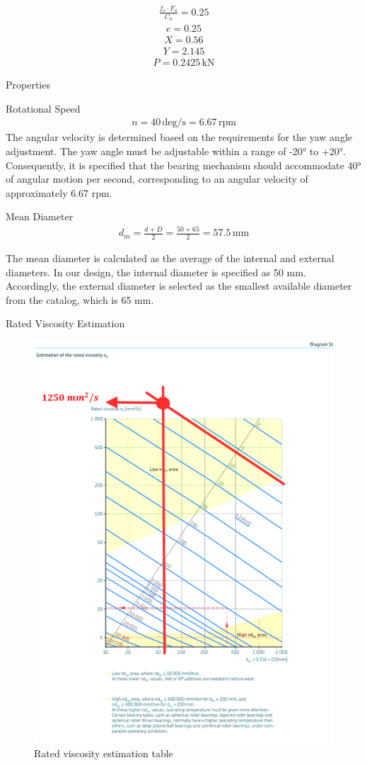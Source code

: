 \documentclass[12pt]{article}
\begin{document}
\begin{align}
\frac{f_o \cdot F_a}{C_o} = 0.25
\end{align}
\begin{align}
e = 0.25
\end{align}
\begin{align}
X=0.56
\end{align}
\begin{align}
Y=2.145
\end{align}
\begin{align}
P=0.2425  \,\mathrm{kN}
\end{align}

Properties

Rotational Speed \begin{align}
n = 40 \, \text{deg/s} = 6.67 \, \text{rpm}
\end{align}
The angular velocity is determined based on the requirements for the yaw angle adjustment. The yaw angle must be adjustable within a range of -20° to +20°. Consequently, it is specified that the bearing mechanism should accommodate 40° of angular motion per second, corresponding to an angular velocity of approximately 6.67 rpm.	

Mean Diameter
\begin{align}
d_m = \frac{d + D}{2} = \frac{50 + 65}{2} = 57.5 \, \mathrm{mm}
\end{align}

The mean diameter is calculated as the average of the internal and external diameters. In our design, the internal diameter is specified as 50 mm. Accordingly, the external diameter is selected as the smallest available diameter from the catalog, which is 65 mm.

Rated Viscosity Estimation

\begin{figure}[h!]
    \centering
    \includegraphics[width=0.5\linewidth]{ratedviscosity.png}
    \caption{Rated viscosity estimation table}
    \label{fig:ratedviscosity}
\end{figure}
\end{document}

